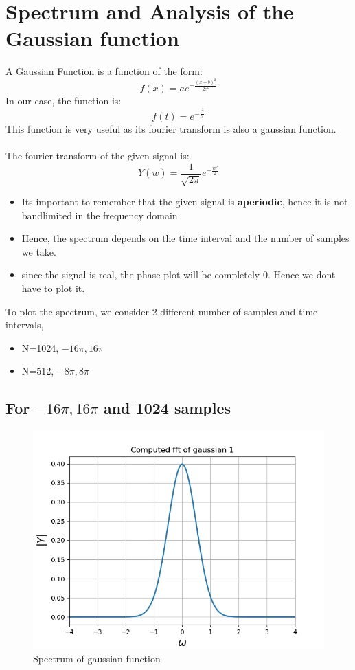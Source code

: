 \documentclass[11pt]{article}
\begin{document}
\section{Spectrum and Analysis of the Gaussian function}
A Gaussian Function is a function of the form:
\begin{equation}
    f(x) = ae^{-\frac{(x-b)^2}{2c^2}}
\end{equation}
In our case, the function is:
\begin{equation}
    f(t) = e^{-\frac{t^2}{2}}
\end{equation}
This function is very useful as its fourier transform is also a gaussian function.\\~\\
The fourier transform of the given signal is:
\begin{equation}
    Y(w) = \frac{1}{\sqrt{2\pi}}e^{-\frac{w^2}{2}}
\end{equation}
\begin{itemize}
    \item Its important to remember that the given signal is \textbf{aperiodic}, hence it is not bandlimited in the frequency domain.
    \item Hence, the spectrum depends on the time interval and the number of samples we take.
    \item since the signal is real, the phase plot will be completely 0. Hence we dont have to plot it. 
\end{itemize}
To plot the spectrum, we consider 2 different number of samples and time intervals,
\begin{itemize}
    \item N=1024, $-16\pi,16\pi$
    \item N=512, $-8\pi,8\pi$
\end{itemize}


\subsection{For $-16\pi,16\pi$ and 1024 samples}
\begin{figure}[H]
    \centering
    \includegraphics[scale = 0.75]{Figure_7a.png}
    \caption{Spectrum of gaussian function}
\end{figure}
\end{document}
